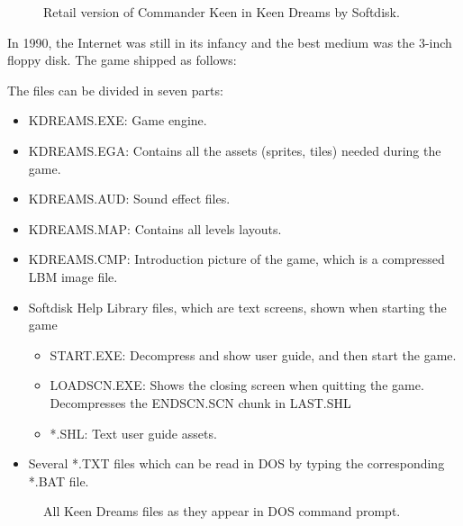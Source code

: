 \documentclass[book.tex]{subfiles}
\begin{document}
\par
\begin{figure}[H]
\centering
{}
\caption{Retail version of Commander Keen in Keen Dreams by Softdisk.}
\end{figure}
\par


In 1990, the Internet was still in its infancy and the best medium was the 3-inch floppy disk. The game shipped as follows:\\

  \par
 The files can be divided in seven parts:
\begin{itemize}
 \item KDREAMS.EXE: Game engine.
 \item KDREAMS.EGA: Contains all the assets (sprites, tiles) needed during the game.
 \item KDREAMS.AUD: Sound effect files.
 \item KDREAMS.MAP: Contains all levels layouts.
 \item KDREAMS.CMP: Introduction picture of the game, which is a compressed LBM image file.
 \item Softdisk Help Library files, which are text screens, shown when starting the game
 \begin{itemize}
   \item START.EXE: Decompress and show user guide, and then start the game.
   \item LOADSCN.EXE: Shows the closing screen when quitting the game. Decompresses the ENDSCN.SCN chunk in LAST.SHL
   \item *.SHL: Text user guide assets. 
 \end{itemize}
 \item Several *.TXT files which can be read in DOS by typing the corresponding *.BAT file. 

\end{itemize}

\par
 \begin{figure}[H]
\centering
 \caption{All Keen Dreams files as they appear in DOS command prompt.}
  \end{figure}
 \par
\end{document}
